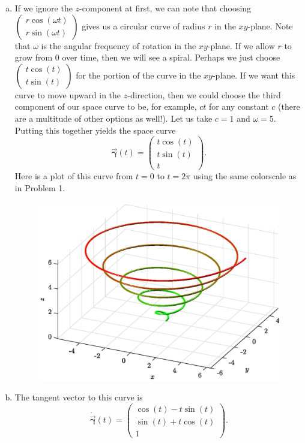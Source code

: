 \documentclass[12pt]{article} %
\newcommand{\curvegamma}{\boldsymbol{\vec{\gamma}}}
\newcommand{\tangentgamma}{\boldsymbol{\dot{\vec{\gamma}}}}
\begin{document}
\begin{solution}
\begin{enumerate}[(a)]
    \item If we ignore the $z$-component at first, we can note that choosing $\begin{pmatrix} r\cos(\omega t) \\ r\sin(\omega t) \end{pmatrix}$ gives us a circular curve of radius $r$ in the $xy$-plane. Note that $\omega$ is the angular frequency of rotation in the $xy$-plane. If we allow $r$ to grow from $0$ over time, then we will see a spiral. Perhaps we just choose $\begin{pmatrix} t\cos(t) \\ t\sin(t) \end{pmatrix}$ for the portion of the curve in the $xy$-plane. If we want this curve to move upward in the $z$-direction, then we could choose the third component of our space curve to be, for example, $ct$ for any constant $c$ (there are a multitude of other options as well!). Let us take $c=1$ and $\omega=5$. Putting this together yields the space curve
    \[
    \curvegamma(t) = \begin{pmatrix} t\cos(t) \\ t\sin(t) \\ t \end{pmatrix}.
    \]
    Here is a plot of this curve from $t=0$ to $t=2\pi$ using the same colorscale as in Problem 1.
    \begin{figure}[H]
        \centering
        \includegraphics[width=.8\textwidth]{figures/2a}
    \end{figure}

    \item The tangent vector to this curve is
    \[
    \tangentgamma(t) = \begin{pmatrix} \cos(t) - t\sin(t) \\ \sin(t)+t\cos(t) \\ 1 \end{pmatrix}.
    \]
    

\end{enumerate}
\end{solution}
\end{document}
